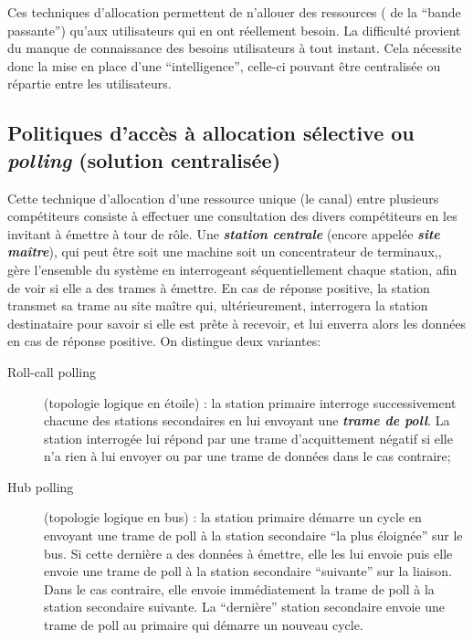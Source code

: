 \documentclass[11pt,english,french]{scrreprt}
\theoremstyle{remark}
\theoremstyle{definition}
\begin{document}
Ces techniques d'allocation permettent de n'allouer des ressources ( de la “bande passante”) qu'aux utilisateurs qui en ont réellement besoin. La difficulté provient du manque de connaissance des besoins utilisateurs à tout instant. Cela nécessite donc la mise en place d'une “intelligence”, celle-ci pouvant être centralisée ou répartie entre les utilisateurs.

\subsection{Politiques d'accès à allocation sélective ou \emph{polling} (solution centralisée)}

Cette technique d'allocation d'une ressource unique (le canal) entre plusieurs compétiteurs consiste à effectuer une consultation des divers compétiteurs en les invitant à émettre à tour de rôle. Une \emph{\textbf{station centrale}} (encore appelée \emph{\textbf{site maître}}), qui peut être soit une machine soit un concentrateur de terminaux,, gère l'ensemble du système en interrogeant séquentiellement chaque station, afin de voir si elle a des trames à émettre. En cas de réponse positive, la station transmet sa trame au site maître qui, ultérieurement, interrogera la station destinataire pour savoir si elle est prête à recevoir, et lui enverra alors les données en cas de réponse positive. On distingue deux variantes:
\begin{description}
	\item [Roll-call polling] (topologie logique en étoile) : la station primaire interroge successivement chacune des stations secondaires en lui envoyant une \emph{\textbf{trame de poll}}. La station interrogée lui répond par une trame d'acquittement négatif si elle n'a rien à lui envoyer ou par une trame de données dans le cas contraire;
	\item [Hub polling] (topologie logique en bus) : la station primaire démarre un cycle en envoyant une trame de poll à la station secondaire “la plus éloignée” sur le bus. Si cette dernière a des données à émettre, elle les lui envoie puis elle envoie une trame de poll à la station secondaire “suivante” sur la liaison. Dans le cas contraire, elle envoie immédiatement la trame de poll à la station secondaire suivante. La “dernière” station secondaire envoie une trame de poll au primaire qui démarre un nouveau cycle.
\end{description}
\end{document}
